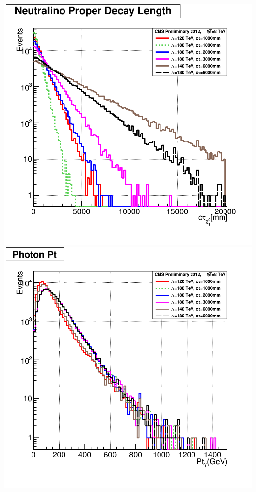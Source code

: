 {\begin{center}
{\includegraphics[scale=0.3]{THESISPLOTS/GMSB-SPS8-MODEL-Neutralino-Proper-DecayLength.png}} \\
\hspace{0.5cm}
\mbox{\includegraphics[scale=0.3]{THESISPLOTS/GMSB-SPS8-MODEL-Photon-Pt.png} \hspace{-1cm}
}
\end{center}}
